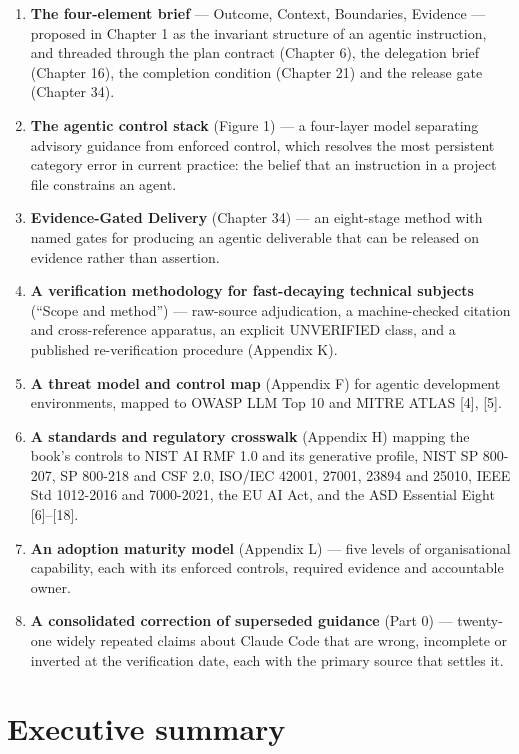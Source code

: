 \documentclass[11pt,a4paper,twoside,openany]{book}
\begin{document}
\begin{enumerate}
\item \textbf{The four-element brief} — Outcome, Context, Boundaries, Evidence — proposed in Chapter 1 as the invariant structure of an agentic instruction, and threaded through the plan contract (Chapter 6), the delegation brief (Chapter 16), the completion condition (Chapter 21) and the release gate (Chapter 34).
\item \textbf{The agentic control stack} (Figure 1) — a four-layer model separating advisory guidance from enforced control, which resolves the most persistent category error in current practice: the belief that an instruction in a project file constrains an agent.
\item \textbf{Evidence-Gated Delivery} (Chapter 34) — an eight-stage method with named gates for producing an agentic deliverable that can be released on evidence rather than assertion.
\item \textbf{A verification methodology for fast-decaying technical subjects} (“Scope and method”) — raw-source adjudication, a machine-checked citation and cross-reference apparatus, an explicit UNVERIFIED class, and a published re-verification procedure (Appendix K).
\item \textbf{A threat model and control map} (Appendix F) for agentic development environments, mapped to OWASP LLM Top 10 and MITRE ATLAS [4], [5].
\item \textbf{A standards and regulatory crosswalk} (Appendix H) mapping the book's controls to NIST AI RMF 1.0 and its generative profile, NIST SP 800-207, SP 800-218 and CSF 2.0, ISO/IEC 42001, 27001, 23894 and 25010, IEEE Std 1012-2016 and 7000-2021, the EU AI Act, and the ASD Essential Eight [6]–[18].
\item \textbf{An adoption maturity model} (Appendix L) — five levels of organisational capability, each with its enforced controls, required evidence and accountable owner.
\item \textbf{A consolidated correction of superseded guidance} (Part 0) — twenty-one widely repeated claims about Claude Code that are wrong, incomplete or inverted at the verification date, each with the primary source that settles it.
\end{enumerate}

\FloatBarrier
\section*{Executive summary}
\end{document}
